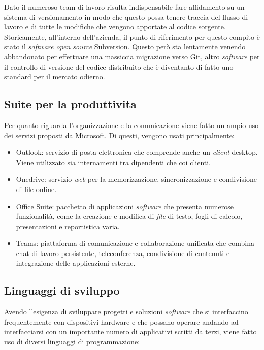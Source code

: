 Dato il numeroso team di lavoro risulta indispensabile fare affidamento su un sistema di versionamento in modo che questo possa tenere traccia del flusso 
di lavoro e di tutte le modifiche che vengono apportate al codice sorgente. Storicamente, all'interno dell'azienda, il punto di riferimento per questo
compito è stato il \emph{software open source} Subversion. Questo però sta lentamente venendo abbandonato per effettuare una massiccia migrazione
verso Git, altro \emph{software} per il controllo di versione del codice distribuito che è diventanto di fatto uno standard per il mercato odierno.

\subsection{Suite per la produttivita}
Per quanto riguarda l'organizzazione e la comunicazione viene fatto un ampio uso dei servizi proposti da Microsoft. Di questi, vengono usati principalmente:
\begin{itemize}
    \item Outlook: servizio di posta elettronica che comprende anche un \emph{client} desktop. Viene utilizzato sia internamenti tra dipendenti che coi clienti.
    \item Onedrive: servizio \emph{web} per la memorizzazione, sincronizzazione e condivisione di file online.
    \item Office Suite: pacchetto di applicazioni \emph{software} che presenta numerose funzionalità, come la creazione e modifica di \emph{file} di testo, fogli di calcolo, presentazioni e reportistica varia.
    \item Teams: piattaforma di comunicazione e collaborazione unificata che combina chat di lavoro persistente, teleconferenza, condivisione di contenuti e integrazione delle applicazioni esterne.
\end{itemize}

\subsection{Linguaggi di sviluppo}

Avendo l'esigenza di sviluppare progetti e soluzioni \emph{software} che si interfaccino frequentemente con dispositivi hardware e che possano operare andando ad interfacciarsi
con un importante numero di applicativi scritti da terzi, viene fatto uso di diversi linguaggi di programmazione:

